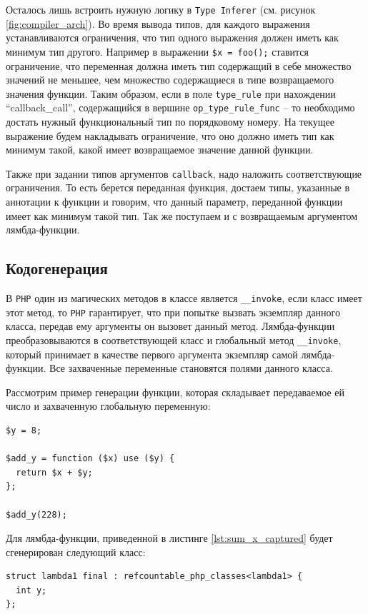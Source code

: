 Осталось лишь встроить нужную логику в \verb|Type Inferer| (см. рисунок \ref{fig:compiler_arch}).
Во время вывода типов, для каждого выражения устанавливаются ограничения, что тип одного выражения должен иметь как минимум тип другого.
Например в выражении \verb|$x = foo();| ставится ограничение, что переменная должна иметь тип содержащий в себе множество значений не меньшее, чем множество содержащиеся в типе возвращаемого значения функции.
Таким образом, если в поле \verb|type_rule| при нахождении ``callback\_call'', содержащийся в вершине \verb|op_type_rule_func| -- то необходимо достать нужный функциональный тип по порядковому номеру.
На текущее выражение будем накладывать ограничение, что оно должно иметь тип как минимум такой, какой имеет возвращаемое значение данной функции.

Также при задании типов аргументов \verb|callback|, надо наложить соответствующие ограничения.
То есть берется переданная функция, достаем типы, указанные в аннотации к функции и говорим, что данный параметр, переданной функции имеет как минимум такой тип.
Так же поступаем и с возвращаемым аргументом лямбда-функции.

\subsection{Кодогенерация}
В \verb|PHP| один из магических методов в классе является \verb|__invoke|, если класс имеет этот метод, то \verb|PHP| гарантирует, что при попытке вызвать экземпляр данного класса, передав ему аргументы он вызовет данный метод.
Лямбда-функции преобразовываются в соответствующей класс и глобальный метод \verb|__invoke|, который принимает в качестве первого аргумента экземпляр самой лямбда-функции.
Все захваченные переменные становятся полями данного класса.

Рассмотрим пример генерации функции, которая складывает передаваемое ей число и захваченную глобальную переменную:
\begin{lstlisting}[label={lst:sum_x_captured},caption={Пример функции, добавляющей к аргументу захваченное значение}]
$y = 8;

$add_y = function ($x) use ($y) {
  return $x + $y;
};

$add_y(228);
\end{lstlisting}

Для лямбда-функции, приведенной в листинге \ref{lst:sum_x_captured} будет сгенерирован следующий класс:
\begin{lstlisting}
struct lambda1 final : refcountable_php_classes<lambda1> {
  int y;
};
\end{lstlisting}

